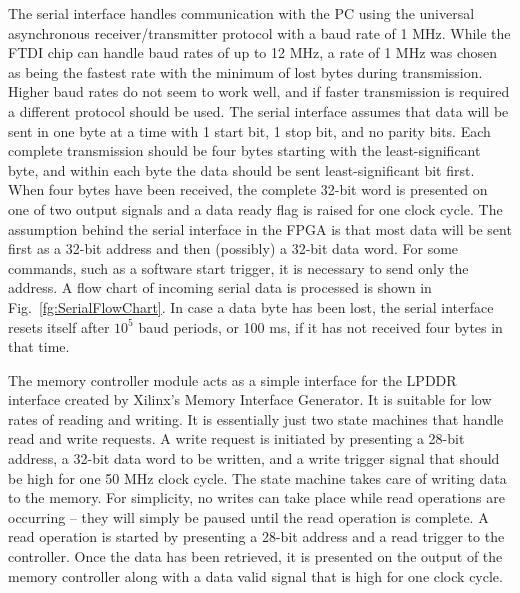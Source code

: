 \documentclass{article}
\begin{document}
The serial interface handles communication with the PC using the universal asynchronous receiver/transmitter protocol with a baud rate of 1 MHz.  While the FTDI chip can handle baud rates of up to 12 MHz, a rate of 1 MHz was chosen as being the fastest rate with the minimum of lost bytes during transmission.  Higher baud rates do not seem to work well, and if faster transmission is required a different protocol should be used.  The serial interface assumes that data will be sent in one byte at a time with 1 start bit, 1 stop bit, and no parity bits.  Each complete transmission should be four bytes starting with the least-significant byte, and within each byte the data should be sent least-significant bit first.  When four bytes have been received, the complete 32-bit word is presented on one of two output signals and a data ready flag is raised for one clock cycle.  The assumption behind the serial interface in the FPGA is that most data will be sent first as a 32-bit address and then (possibly) a 32-bit data word.  For some commands, such as a software start trigger, it is necessary to send only the address.  A flow chart of incoming serial data is processed is shown in Fig.~\ref{fg:SerialFlowChart}.  In case a data byte has been lost, the serial interface resets itself after $10^5$ baud periods, or 100 ms, if it has not received four bytes in that time.

The memory controller module acts as a simple interface for the LPDDR interface created by Xilinx's Memory Interface Generator.  It is suitable for low rates of reading and writing.  It is essentially just two state machines that handle read and write requests.  A write request is initiated by presenting a 28-bit address, a 32-bit data word to be written, and a write trigger signal that should be high for one 50 MHz clock cycle.  The state machine takes care of writing data to the memory.  For simplicity, no writes can take place while read operations are occurring -- they will simply be paused until the read operation is complete.  A read operation is started by presenting a 28-bit address and a read trigger to the controller.  Once the data has been retrieved, it is presented on the output of the memory controller along with a data valid signal that is high for one clock cycle.
\end{document}
